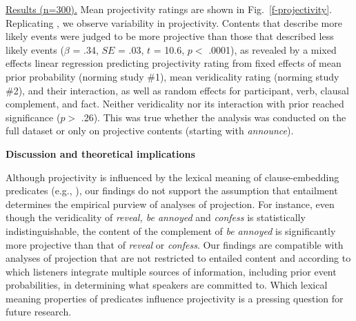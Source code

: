 \documentclass[12pt,fleqn]{article}
\newcommand{\6}{\mbox{$[\hspace*{-.6mm}[$}}
\newcommand{\9}{\mbox{$]\hspace*{-.6mm}]$}}
\begin{document}
\underline{Results (n=300).}  Mean projectivity ratings are shown in Fig.~\ref{f-projectivity}. Replicating \citealt{tbd-variability}, we observe variability in projectivity. Contents that describe more likely events were judged to be more projective than those that described less likely events ($\beta$ = .34, $SE$ = .03, $t$ = 10.6, $p <$ .0001), as revealed by a mixed effects linear regression predicting projectivity rating from fixed effects of mean prior probability (norming study \#1), mean veridicality rating (norming study \#2), and their interaction, as well as random effects for participant, verb, clausal complement, and fact. Neither veridicality nor its interaction with prior reached significance ($p >$ .26). This was true whether the analysis was conducted on the full dataset or only on projective contents (starting with {\em announce}).

{\bf Discussion and theoretical implications}

Although projectivity is influenced by the lexical meaning of clause-embedding predicates (e.g., \citealt{karttunen71b,tbd-variability}), our findings do not support the assumption that entailment determines the empirical purview of analyses of projection. For instance, even though the veridicality of {\em reveal, be annoyed} and {\em confess} is statistically indistinguishable, the content of the complement of {\em be annoyed} is significantly more projective than that of {\em reveal} or {\em confess}. Our findings are compatible with analyses of projection that are not restricted to entailed content and according to which listeners integrate multiple sources of information, including prior event probabilities, in determining what speakers are committed to. Which lexical meaning properties of predicates influence projectivity is a pressing question for future research. 
 
\end{document}
